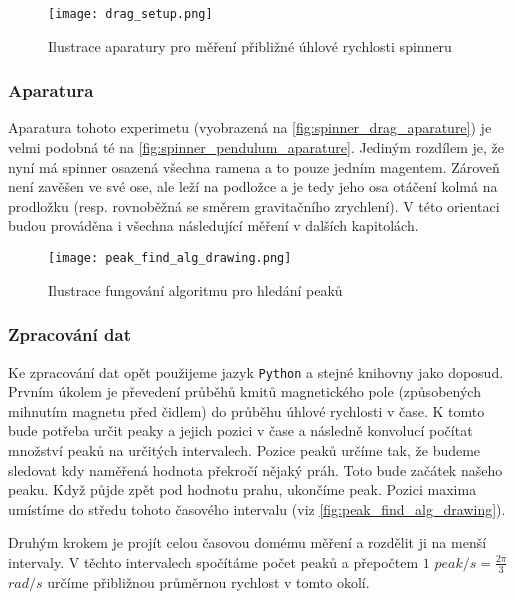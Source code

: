 \begin{wrapfigure}{r}{0.5\textwidth}
    \vspace*{-1.5cm}
    \texttt{[image: drag\_setup.png]}
    \centering
    \caption{Ilustrace aparatury pro měření přibližné úhlové rychlosti spinneru}
    \label{fig:spinner_drag_aparature}
\end{wrapfigure}

\subsubsection{Aparatura}
Aparatura tohoto experimetu (vyobrazená na \autoref{fig:spinner_drag_aparature}) je velmi podobná té na \autoref{fig:spinner_pendulum_aparature}. Jediným rozdílem je, že nyní má spinner osazená všechna ramena a to pouze jedním magentem. Zároveň není zavěšen ve své ose, ale leží na podložce a je tedy jeho osa otáčení kolmá na prodložku (resp. rovnoběžná se směrem gravitačního zrychlení). V této orientaci budou prováděna i všechna následující měření v dalších kapitolách.

\begin{wrapfigure}{r}{0.5\textwidth}
    \vspace*{3cm}
    \texttt{[image: peak\_find\_alg\_drawing.png]}
    \centering
    \caption{Ilustrace fungování algoritmu pro hledání peaků}
    \label{fig:peak_find_alg_drawing}
\end{wrapfigure}
\subsubsection{Zpracování dat}
Ke zpracování dat opět použijeme jazyk \texttt{Python} a stejné knihovny jako doposud.
Prvním úkolem je převedení průběhů kmitů magnetického pole (způsobených mihnutím magnetu před čidlem) do průběhu úhlové rychlosti v čase.
K tomto bude potřeba určit peaky a jejich pozici v čase a následně konvolucí počítat množství peaků na určitých intervalech.
Pozice peaků určíme tak, že budeme sledovat kdy naměřená hodnota překročí nějaký práh. Toto bude začátek našeho peaku.
Když půjde zpět pod hodnotu prahu, ukončíme peak. Pozici maxima umístíme do středu tohoto časového intervalu (viz \autoref{fig:peak_find_alg_drawing}).

\clearpage

Druhým krokem je projít celou časovou domému měření a rozdělit ji na menší intervaly. V těchto intervalech spočítáme počet peaků a přepočtem $1$ $peak/s = \frac{2\pi}{3}$ $rad/s$ určíme přibližnou průměrnou rychlost v tomto okolí.

